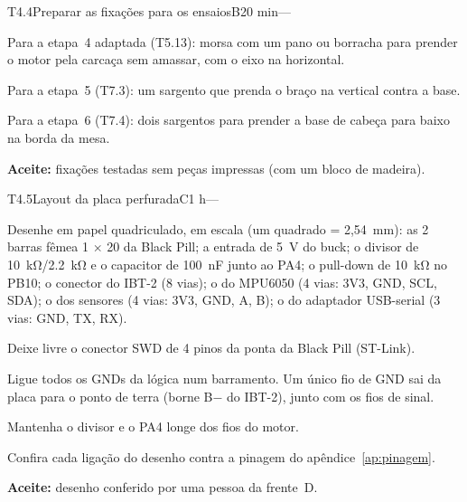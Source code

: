 \documentclass[11pt,a4paper]{article}
\begin{document}
\begin{tarefa}{T4.4}{Preparar as fixações para os ensaios}{B}{20 min}{---}
\begin{passos}
  \item Para a etapa~4 adaptada (T5.13): morsa com um pano ou borracha para prender o motor
    pela carcaça sem amassar, com o eixo na horizontal.
  \item Para a etapa~5 (T7.3): um sargento que prenda o braço na vertical contra a base.
  \item Para a etapa~6 (T7.4): dois sargentos para prender a base de cabeça para baixo na
    borda da mesa.
\end{passos}
\textbf{Aceite:} fixações testadas sem peças impressas (com um bloco de madeira).
\end{tarefa}

\begin{tarefa}{T4.5}{Layout da placa perfurada}{C}{1 h}{---}
\begin{passos}
  \item Desenhe em papel quadriculado, em escala (um quadrado = 2,54~mm): as 2 barras fêmea
    1 $\times$ 20 da Black Pill; a entrada de 5~V do buck; o divisor de
    \qty{10}{\kilo\ohm}/\qty{2,2}{\kilo\ohm} e o capacitor de \qty{100}{\nano\farad} junto
    ao PA4; o pull-down de \qty{10}{\kilo\ohm} no PB10; o conector do IBT-2 (8 vias); o do
    MPU6050 (4 vias: 3V3, GND, SCL, SDA); o dos sensores (4 vias: 3V3, GND, A, B); o do
    adaptador USB-serial (3 vias: GND, TX, RX).
  \item Deixe livre o conector SWD de 4 pinos da ponta da Black Pill (ST-Link).
  \item Ligue todos os GNDs da lógica num barramento. Um único fio de GND sai da placa para o
    ponto de terra (borne B$-$ do IBT-2), junto com os fios de sinal.
  \item Mantenha o divisor e o PA4 longe dos fios do motor.
  \item Confira cada ligação do desenho contra a pinagem do apêndice~\ref{ap:pinagem}.
\end{passos}
\textbf{Aceite:} desenho conferido por uma pessoa da frente~D.
\end{tarefa}
\end{document}
